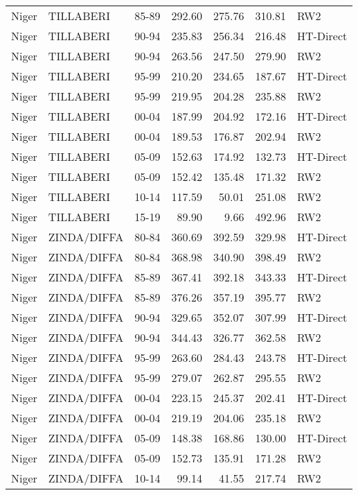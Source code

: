 \begin{longtable}{lllrrrl}
  Niger & TILLABERI & 85-89 & 292.60 & 275.76 & 310.81 & RW2 \\ 
  Niger & TILLABERI & 90-94 & 235.83 & 256.34 & 216.48 & HT-Direct \\ 
  Niger & TILLABERI & 90-94 & 263.56 & 247.50 & 279.90 & RW2 \\ 
  Niger & TILLABERI & 95-99 & 210.20 & 234.65 & 187.67 & HT-Direct \\ 
  Niger & TILLABERI & 95-99 & 219.95 & 204.28 & 235.88 & RW2 \\ 
  Niger & TILLABERI & 00-04 & 187.99 & 204.92 & 172.16 & HT-Direct \\ 
  Niger & TILLABERI & 00-04 & 189.53 & 176.87 & 202.94 & RW2 \\ 
  Niger & TILLABERI & 05-09 & 152.63 & 174.92 & 132.73 & HT-Direct \\ 
  Niger & TILLABERI & 05-09 & 152.42 & 135.48 & 171.32 & RW2 \\ 
  Niger & TILLABERI & 10-14 & 117.59 & 50.01 & 251.08 & RW2 \\ 
  Niger & TILLABERI & 15-19 & 89.90 & 9.66 & 492.96 & RW2 \\ 
  Niger & ZINDA/DIFFA & 80-84 & 360.69 & 392.59 & 329.98 & HT-Direct \\ 
  Niger & ZINDA/DIFFA & 80-84 & 368.98 & 340.90 & 398.49 & RW2 \\ 
  Niger & ZINDA/DIFFA & 85-89 & 367.41 & 392.18 & 343.33 & HT-Direct \\ 
  Niger & ZINDA/DIFFA & 85-89 & 376.26 & 357.19 & 395.77 & RW2 \\ 
  Niger & ZINDA/DIFFA & 90-94 & 329.65 & 352.07 & 307.99 & HT-Direct \\ 
  Niger & ZINDA/DIFFA & 90-94 & 344.43 & 326.77 & 362.58 & RW2 \\ 
  Niger & ZINDA/DIFFA & 95-99 & 263.60 & 284.43 & 243.78 & HT-Direct \\ 
  Niger & ZINDA/DIFFA & 95-99 & 279.07 & 262.87 & 295.55 & RW2 \\ 
  Niger & ZINDA/DIFFA & 00-04 & 223.15 & 245.37 & 202.41 & HT-Direct \\ 
  Niger & ZINDA/DIFFA & 00-04 & 219.19 & 204.06 & 235.18 & RW2 \\ 
  Niger & ZINDA/DIFFA & 05-09 & 148.38 & 168.86 & 130.00 & HT-Direct \\ 
  Niger & ZINDA/DIFFA & 05-09 & 152.73 & 135.91 & 171.28 & RW2 \\ 
  Niger & ZINDA/DIFFA & 10-14 & 99.14 & 41.55 & 217.74 & RW2 \\ 

\end{longtable}
